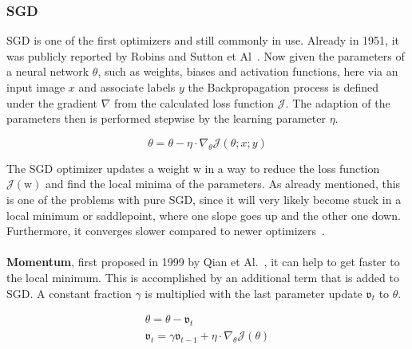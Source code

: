 %
\subsubsection{\gls{SGD}}
\gls{SGD} is one of the first optimizers and still commonly in use.
Already in 1951, it was publicly reported by Robins and Sutton et Al~\cite{sgd}.
Now given the parameters of a neural network $\theta$, such as weights, biases and activation functions, here via an input image
$x$ and associate labels $y$ the Backpropagation process is defined under the gradient $\nabla$
from the calculated loss function $\mathcal{J}$.
The adaption of the parameters then is performed stepwise by the learning parameter $\eta$.


\begin{equation}
    \theta = \theta - \eta\cdot\nabla_\theta\mathcal{J}(\theta;x;y)
    \label{eqn:sgd}
\end{equation}

The \gls{SGD} optimizer updates a weight $\mathrm{w}$ in a way to reduce the loss function $\mathcal{J}(\mathrm{w})$ and find
the local minima of the parameters.
As already mentioned, this is one of the problems with pure \gls{SGD}, since it will very likely become stuck in a local minimum or
saddlepoint, where one slope goes up and the other one down.
Furthermore, it converges slower compared to newer optimizers~\cite{optimizersoverview, optimizersexplained}.
\\\mbox{}\\
\textbf{Momentum}, first proposed in 1999 by Qian et Al.~\cite{momentum}, it can help to get faster to the local minimum.
This is accomplished by an additional term that is added to \gls{SGD}.
A constant fraction $\gamma$ is multiplied with the last parameter update $\mathfrak{v}_t$ to $\theta$.

\begin{align}
    \theta = \theta - \mathfrak{v}_t \label{eqn:momentum:1}\\
    \mathfrak{v}_t = \gamma\mathfrak{v}_{t-1} + \eta\cdot\nabla_\theta\mathcal{J}(\theta) \label{eqn:momentum:2}
\end{align}

